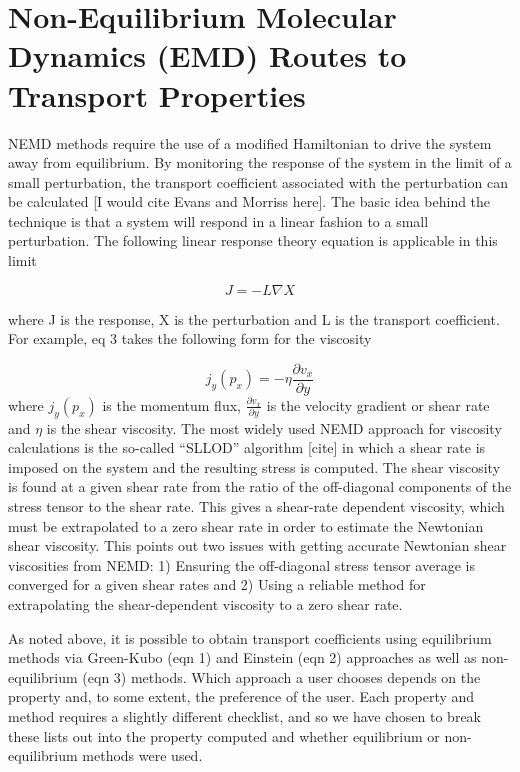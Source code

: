 \documentclass[9pt]{livecoms}
\begin{document}
\section{Non-Equilibrium Molecular Dynamics (EMD) Routes to Transport Properties}

NEMD methods require the use of a modified Hamiltonian to drive the system away from equilibrium. By monitoring the response of the system in the limit of a small perturbation, the transport coefficient associated with the perturbation can be calculated [I would cite Evans and Morriss here]. The basic idea behind the technique is that a system will respond in a linear fashion to a small perturbation. The following linear response theory equation is applicable in this limit

\begin{equation}
J = -L \nabla X
\end{equation}

where J is the response, X is the perturbation and L is the transport coefficient. For example, eq 3 takes the following form for the viscosity

\begin{equation}
j_y(p_x) = -\eta \frac{\partial v_x}{\partial y}
\end{equation}
where $j_y(p_x)$ is the momentum flux, $\frac{\partial v_x}{\partial y}$ is the velocity gradient or shear rate and $\eta$ is the shear viscosity.  The most widely used NEMD approach for viscosity calculations is the so-called “SLLOD” algorithm [cite] in which a shear rate is imposed on the system and the resulting stress is computed. The shear viscosity is found at a given shear rate from the ratio of the off-diagonal components of the stress tensor to the shear rate. This gives a shear-rate dependent viscosity, which must be extrapolated to a zero shear rate in order to estimate the Newtonian shear viscosity. This points out two issues with getting accurate Newtonian shear viscosities from NEMD: 1) Ensuring the off-diagonal stress tensor average is converged for a given shear rates and 2) Using a reliable method for extrapolating the shear-dependent viscosity to a zero shear rate. 

As noted above, it is possible to obtain transport coefficients using equilibrium methods via Green-Kubo (eqn 1) and Einstein (eqn 2) approaches as well as non-equilibrium (eqn 3) methods. Which approach a user chooses depends on the property and, to some extent, the preference of the user. Each property and method requires a slightly different checklist, and so we have chosen to break these lists out into the property computed and whether equilibrium or non-equilibrium methods were used.
\end{document}
